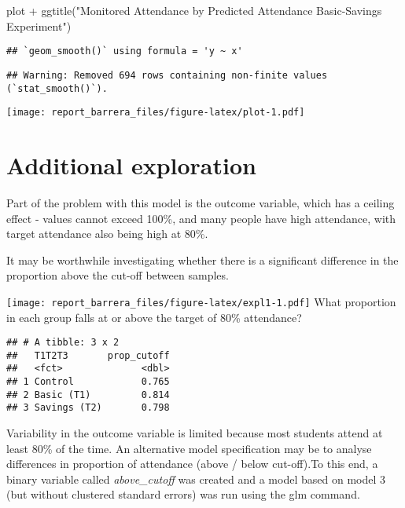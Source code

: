\documentclass[
]{article}
\newenvironment{Shaded}{\begin{snugshade}}{\end{snugshade}}
\newcommand{\FunctionTok}[1]{\textcolor[rgb]{0.00,0.00,0.00}{#1}}
\newcommand{\NormalTok}[1]{#1}
\newcommand{\SpecialCharTok}[1]{\textcolor[rgb]{0.00,0.00,0.00}{#1}}
\newcommand{\StringTok}[1]{\textcolor[rgb]{0.31,0.60,0.02}{#1}}
\begin{document}
\begin{Shaded}
\begin{Highlighting}[]
\NormalTok{plot }\SpecialCharTok{+}  \FunctionTok{ggtitle}\NormalTok{(}\StringTok{"Monitored Attendance by Predicted Attendance Basic{-}Savings Experiment"}\NormalTok{)}
\end{Highlighting}
\end{Shaded}

\begin{verbatim}
## `geom_smooth()` using formula = 'y ~ x'
\end{verbatim}

\begin{verbatim}
## Warning: Removed 694 rows containing non-finite values (`stat_smooth()`).
\end{verbatim}

\texttt{[image: report\_barrera\_files/figure-latex/plot-1.pdf]}

\hypertarget{additional-exploration}{%
\section{Additional exploration}\label{additional-exploration}}

Part of the problem with this model is the outcome variable, which has a
ceiling effect - values cannot exceed 100\%, and many people have high
attendance, with target attendance also being high at 80\%.

It may be worthwhile investigating whether there is a significant
difference in the proportion above the cut-off between samples.

\texttt{[image: report\_barrera\_files/figure-latex/expl1-1.pdf]} What
proportion in each group falls at or above the target of 80\%
attendance?

\begin{verbatim}
## # A tibble: 3 x 2
##   T1T2T3       prop_cutoff
##   <fct>              <dbl>
## 1 Control            0.765
## 2 Basic (T1)         0.814
## 3 Savings (T2)       0.798
\end{verbatim}

Variability in the outcome variable is limited because most students
attend at least 80\% of the time. An alternative model specification may
be to analyse differences in proportion of attendance (above / below
cut-off).To this end, a binary variable called \emph{above\_cutoff} was
created and a model based on model 3 (but without clustered standard
errors) was run using the glm command.
\end{document}
